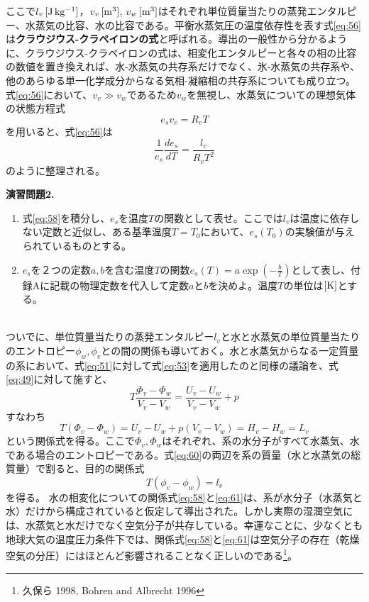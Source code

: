 \documentclass{ltjsarticle}
\begin{document}
ここで$l_{v}\, [\rm{J\,kg^{-1}}]$，$v_{v}\, [\rm{m^{3}}]$, $v_{w}\, [\rm{m^{3}}]$はそれぞれ単位質量当たりの蒸発エンタルピー、水蒸気の比容、水の比容である。平衡水蒸気圧の温度依存性を表す式\eqref{eq:56}は{\bf クラウジウス-クラペイロンの式}と呼ばれる。導出の一般性から分かるように、クラウジウス-クラペイロンの式は、相変化エンタルピーと各々の相の比容の数値を置き換えれば、水-水蒸気の共存系だけでなく、氷-水蒸気の共存系や、他のあらゆる単一化学成分からなる気相-凝縮相の共存系についても成り立つ。式\eqref{eq:56}において、$v_{v} \gg v_{w}$であるため$v_{w}$を無視し、水蒸気についての理想気体の状態方程式
\begin{equation}\label{eq:57}
 e_{s}v_{v}=R_{v}T
\end{equation}
を用いると、式\eqref{eq:56}は
\begin{equation}\label{eq:58}
 \frac{1}{e_{s}}\frac{de_{s}}{dT}=\frac{l_{v}}{R_{v}T^{2}}
\end{equation}
のように整理される。
\\
\begin{itembox}[l]{\bf{演習問題2.}}
\begin{enumerate}
\item 式\eqref{eq:58}を積分し、$e_{s}$を温度$T$の関数として表せ。ここでは$l_{v}$は温度に依存しない定数と近似し、ある基準温度$T=T_{0}$において、$e_{s}(T_{0})$の実験値が与えられているものとする。
\item $e_{s}$を２つの定数$a,b$を含む温度$T$の関数$e_{s}(T)=a\exp(-\frac{b}{T})$として表し、付録Aに記載の物理定数を代入して定数$a$と$b$を決めよ。温度$T$の単位は$[\rm{K}]$とする。
\end{enumerate}
\end{itembox}
\\

ついでに、単位質量当たりの蒸発エンタルピー$l_{v}$と水と水蒸気の単位質量当たりのエントロピー$\phi_{w},\phi_{v}$との間の関係も導いておく。水と水蒸気からなる一定質量の系において、式\eqref{eq:51}に対して式\eqref{eq:53}を適用したのと同様の議論を、式\eqref{eq:49}に対して施すと、
\begin{equation}\label{eq:59}
 T\frac{\Phi_{v}-\Phi_{w}}{V_{v}-V_{w}}=\frac{U_{v}-U_{w}}{V_{v}-V_{w}}+p
\end{equation}
すなわち
\begin{equation}\label{eq:60}
 T(\Phi_{v}-\Phi_{w})=U_{v}-U_{w}+p(V_{v}-V_{w})=H_{v}-H_{w}=L_{v}
\end{equation}
という関係式を得る。ここで$\Phi_{v},\Phi_{w}$はそれぞれ、系の水分子がすべて水蒸気、水である場合のエントロピーである。式\eqref{eq:60}の両辺を系の質量（水と水蒸気の総質量）で割ると、目的の関係式
\begin{equation}\label{eq:61}
 T(\phi_{v}-\phi_{w})=l_{v}
\end{equation}
を得る。 水の相変化についての関係式\eqref{eq:58}と\eqref{eq:61}は、系が水分子（水蒸気と水）だけから構成されていると仮定して導出された。しかし実際の湿潤空気には、水蒸気と水だけでなく空気分子が共存している。幸運なことに、少なくとも地球大気の温度圧力条件下では、関係式\eqref{eq:58}と\eqref{eq:61}は空気分子の存在（乾燥空気の分圧）にはほとんど影響されることなく正しいのである\footnote{久保ら 1998, Bohren and Albrecht 1996}。
\end{document}
